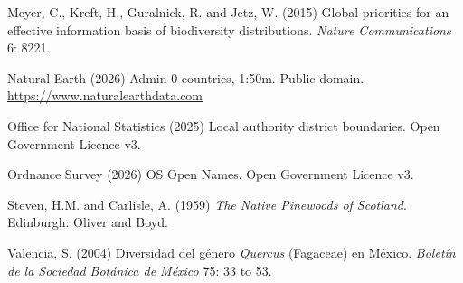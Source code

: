 \documentclass[11pt,a4paper]{article}
\begin{document}
Meyer, C., Kreft, H., Guralnick, R. and Jetz, W. (2015) Global priorities for an effective information basis of biodiversity distributions. \textit{Nature Communications} 6: 8221.

Natural Earth (2026) Admin 0 countries, 1:50m. Public domain. \url{https://www.naturalearthdata.com}

Office for National Statistics (2025) Local authority district boundaries. Open Government Licence v3.

Ordnance Survey (2026) OS Open Names. Open Government Licence v3.

Steven, H.M. and Carlisle, A. (1959) \textit{The Native Pinewoods of Scotland}. Edinburgh: Oliver and Boyd.

Valencia, S. (2004) Diversidad del g\'enero \textit{Quercus} (Fagaceae) en M\'exico. \textit{Boletín de la Sociedad Botánica de México} 75: 33 to 53.
\end{document}
